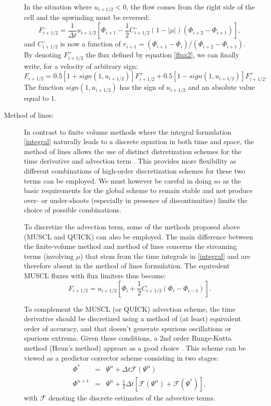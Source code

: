 \documentclass[12pt,A4,french]{article}
\begin{document}
\begin{description}
In the situation where $u_{i+1/2} < 0$, the flow comes from the right side of the cell and the upwinding must be reversed:
\begin{equation}
F^{-}_{i+1/2} = \frac{1}{\Delta t} u_{i+1/2}\left[\Phi_{i+1} - \frac{1}{2}C^{-}_{i+1/2}\left(1 - \left|\mu\right|\right)\left(\Phi_{i+2} - \Phi_{i+1}\right)\right],
\end{equation}
and $C^{-}_{i+1/2}$ is now a function of $r_{i+1} = \left(\Phi_{i+1} - \Phi_i\right)/\left(\Phi_{i+2} - \Phi_{i+1}\right)$. By denoting $F^{+}_{i+1/2}$ the flux defined by equation \ref{flux2}, we can finally write, for a velocity of arbitrary sign:
\begin{equation}
F_{i+1/2} = 0.5\left[1 + sign\left(1,u_{i+1/2}\right)\right]F^{+}_{i+1/2} + 0.5\left[1 - sign\left(1,u_{i+1/2}\right)\right]F^{+}_{i+1/2}.
\end{equation}
The function $sign\left(1,u_{i+1/2}\right)$ has the sign of $u_{i+1/2}$ and an absolute value equal to $1$.

\item[Method of lines:]
In contrast to finite volume methods where the integral formulation \ref{integral} naturally leads to a discrete equation in both time and space, the method of lines allows the use of distinct distretization schemes for the time derivative and advection term \cite{Lev2002}. This provides more flexibility as different combinations of high-order discretization schemes for these two terms can be employed. We must however be careful in doing so as the basic requirements for the global scheme to remain stable and not produce over- or under-shoots (especially in presence of discontinuities) limits the choice of possible combinations.

To discretize the advection term, some of the methods proposed above (MUSCL and QUICK) can also be employed. The main difference between the finite-volume method and method of lines concerns the streaming terms (involving $\mu$) that stem from the time integrals in \ref{integral} and are therefore absent in the method of lines formulation. The equivalent MUSCL fluxes with flux limiters thus become:
\begin{equation}
F_{i+1/2} = u_{i+1/2}\left[\Phi_i + \frac{1}{2}C_{i+1/2}\left(\Phi_{i} - \Phi_{i-1}\right)\right].
\end{equation}

To complement the MUSCL (or QUICK) advection scheme, the time derivative should be discretized using a method of (at least) equivalent order of accuracy, and that doesn't generate spurious oscillations or spurious extrema. Given these conditions, a 2nd order Runge-Kutta method (Heun's method) appears as a good choice \cite{GS1998}. This scheme can be viewed as a predictor corrector scheme consisting in two stages:
\begin{eqnarray}
\Phi^* &=& \Psi^{n} + \Delta t \mathcal{F}\left(\Psi^{n}\right)\\
\Phi^{n+1} &=& \Psi^{n} + \frac{1}{2}\Delta t \left[ \mathcal{F}\left(\Psi^{n}\right) + \mathcal{F}\left(\Psi^{*}\right)\right],
\end{eqnarray}
with $\mathcal{F}$ denoting the discrete estimates of the advective terms.


\end{description}
\end{document}
